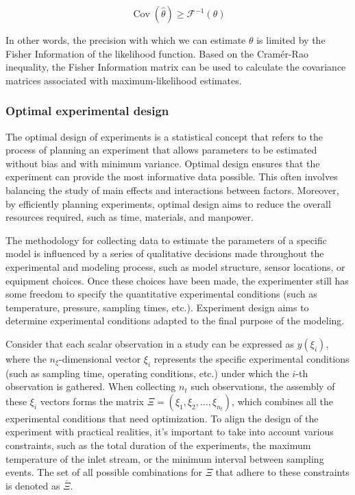\documentclass[../Article_Design_of_Experiment.tex]{subfiles}
\begin{document}
	{\footnotesize \begin{equation} \operatorname{Cov}(\hat{\theta}) \geq \mathcal{F}^{-1}(\theta) \end{equation} }
	
	In other words, the precision with which we can estimate $\theta$ is limited by the Fisher Information of the likelihood function. Based on the Cramér-Rao inequality, the Fisher Information matrix can be used to calculate the covariance matrices associated with maximum-likelihood estimates.
	
	\subsubsection{Optimal experimental design}
	
	The optimal design of experiments is a statistical concept that refers to the process of planning an experiment that allows parameters to be estimated without bias and with minimum variance. Optimal design ensures that the experiment can provide the most informative data possible. This often involves balancing the study of main effects and interactions between factors. Moreover, by efficiently planning experiments, optimal design aims to reduce the overall resources required, such as time, materials, and manpower.
	
	The methodology for collecting data to estimate the parameters of a specific model is influenced by a series of qualitative decisions made throughout the experimental and modeling process, such as model structure, sensor locations, or equipment choices. Once these choices have been made, the experimenter still has some freedom to specify the quantitative experimental conditions (such as temperature, pressure, sampling times, etc.). Experiment design aims to determine experimental conditions adapted to the final purpose of the modeling.
	
	Consider that each scalar observation in a study can be expressed as $y(\xi_i)$, where the $n_\xi$-dimensional vector $\xi_i$ represents the specific experimental conditions (such as sampling time, operating conditions, etc.) under which the $i$-th observation is gathered. When collecting $n_t$ such observations, the assembly of these $\xi_i$ vectors forms the matrix $\Xi = (\xi_1, \xi_2, \dots, \xi_{n_t})$, which combines all the experimental conditions that need optimization. To align the design of the experiment with practical realities, it's important to take into account various constraints, such as the total duration of the experiments, the maximum temperature of the inlet stream, or the minimum interval between sampling events. The set of all possible combinations for $\Xi$ that adhere to these constraints is denoted as $\bar{\Xi}$.
	
\end{document}
